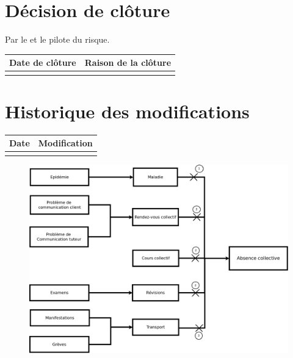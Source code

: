 \section*{Décision de clôture}
Par le \CP{} et le pilote du risque.
\begin{table}[H]
\centering
	\begin{tabularx}{12.8cm}{|X|X|}
	\hline
	Date de clôture & Raison de la clôture \\
	\hline
	  & \\
	\hline
	\end{tabularx}
\end{table}

\section*{Historique des modifications}
\begin{table}[H]
\centering
	\begin{tabularx}{12.8cm}{|X|X|}
	\hline
	Date & Modification \\
	\hline
	  & \\
	\hline
	\end{tabularx}
\end{table}
\newpage


\begin{figure}
	\centering
	\includegraphics[scale=0.35]{../images/AnalyseRisque_nPourquoi_FDR003.png}
\end{figure}